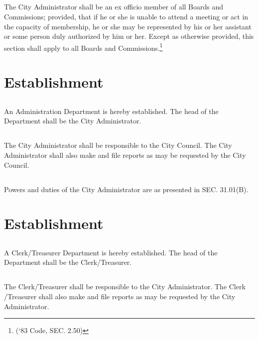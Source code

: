 \subsection{}
The City Administrator shall be an ex officio member of all Boards and Commissions; provided, that if he or she is unable to attend a meeting or act in the capacity of membership, he or she may be represented by his or her assistant or some person duly authorized by him or her. Except as otherwise provided, this section shall apply to all Boards and Commissions.\footnote{(‘83 Code, SEC. 2.50)}\\

\setcounter{section}{9}
\section{Establishment}
\subsection{}
An Administration Department is hereby established. The head of the Department shall be the City Administrator.
\subsection{}
The City Administrator shall be responsible to the City Council. The City Administrator shall also make and file reports as may be requested by the City Council.
\subsection{}
Powers and duties of the City Administrator are as presented in SEC. 31.01(B).\\

\setcounter{section}{19}
\section{Establishment}
\subsection{}
A Clerk/Treasurer Department is hereby established. The head of the Department shall be the Clerk/Treasurer.
\subsection{}
The Clerk/Treasurer shall be responsible to the City Administrator. The Clerk /Treasurer shall also make and file reports as may be requested by the City Administrator.\\

